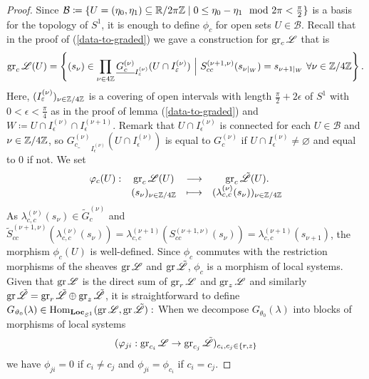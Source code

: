 \begin{proof}
    Since $\mathcal{B}\coloneqq \{U=(\eta_0,\eta_1) \subseteq \mathbb{R}/2\pi\mathbb{Z} \mid 0 \leq \eta_0 - \eta_1 \mod 2\pi < \frac{\pi}{2}\}$ is a basis for the topology of $S^1$,
    it is enough to define $\phi_c$ for open sets $U \in \mathcal{B}$. Recall that in the proof of (\ref{data-to-graded}) we gave a construction for $\operatorname{gr}_c\mathscr{L}$ that is 
    \[
    \operatorname{gr}_c\mathscr{L}(U) = \left\{(s_\nu)\in\prod_{\nu\in \/4\mathbb{Z}} \underline{G_c^{(\nu)}}_{I^{(\nu)}_\varepsilon}(U \cap I^{(\nu)}_\varepsilon) ~\Big\vert ~ S_{cc}^{(\nu+1, \nu)}(s_{\nu\vert_{W}}) = s_{\nu+1\vert_{W}} ~\forall \nu \in \mathbb{Z}/4\mathbb{Z} \right\}.
    \]
    Here, $(I^{(\nu)}_\varepsilon)_{\nu \in \mathbb{Z}/4\mathbb{Z}}$ is a covering of open intervals with length $\frac{\pi}{2}+2\epsilon$ of $S^1$ with $0< \epsilon < \frac{\pi}{4}$ as in the proof of lemma (\ref{data-to-graded}) and $W \coloneqq U \cap I_\epsilon^{(\nu)} \cap I_{\epsilon}^{(\nu+1)}$.
    Remark that $U\cap I^{(\nu)}_\epsilon$ is connected for each $U \in \mathcal{B}$ and $\nu \in \mathbb{Z}/4\mathbb{Z}$, so $\underline{G_c^{(\nu)}}_{I^{(\nu)}_\epsilon}(U \cap I^{(\nu)}_\epsilon)$ is equal to $G_c^{(\nu)}$ if $U \cap I^{(\nu)}_\epsilon \neq \varnothing$ and equal to $0$ if not. We set
    \[
    \begin{matrix}
        \varphi_c(U): &\operatorname{gr}_c\mathscr{L}(U) &\longrightarrow &\operatorname{gr}_c\tilde{\mathscr{L}}(U). \\
        & (s_\nu)_{\nu \in \mathbb{Z}/4\mathbb{Z}} & \longmapsto & (\lambda^{(\nu)}_{c,c}(s_\nu))_{\nu \in \mathbb{Z}/4\mathbb{Z}}
    \end{matrix}
    \]
    As $\lambda_{c,c}^{(\nu)}(s_\nu) \in \tilde{G}_c^{(\nu)}$ and $\tilde{S}_{cc}^{(\nu+1,\nu)}(\lambda_{c,c}^{(\nu)}(s_\nu)) = \lambda_{c,c}^{(\nu+1)}(S^{(\nu+1,\nu)}_{cc}(s_\nu)) = \lambda_{c,c}^{(\nu+1)}(s_{\nu+1})$, the morphism $\phi_c(U)$ is well-defined. Since $\phi_c$ commutes with the restriction morphisms of the sheaves $\operatorname{gr}\mathscr{L}$ and $\operatorname{gr}\tilde{\mathscr{L}}$, $\phi_c$ is a morphism of local systems. Given that $\operatorname{gr}\mathscr{L}$ is the direct sum of $\operatorname{gr}_r\mathscr{L}$ and $\operatorname{gr}_z\mathscr{L}$ and similarly $\operatorname{gr}\tilde{\mathscr{L}} = \operatorname{gr}_r\tilde{\mathscr{L}} \oplus \operatorname{gr}_z\tilde{\mathscr{L}}$, it is straightforward to define $G_{\vartheta_0}(\lambda) \in \operatorname{Hom}_{\mathbf{Loc}_{S^1}}(\operatorname{gr}\mathscr{L},\operatorname{gr}\tilde{\mathscr{L}}):$
    When we decompose $G_{\theta_0}(\lambda)$ into blocks of morphisms of local systems \[(\varphi_{ji}: \operatorname{gr}_{c_i}\mathscr{L} \to \operatorname{gr}_{c_j}\tilde{\mathscr{L}})_{c_i,c_j\in \{r,z\}}\] we have $\phi_{ji} = 0$ if $c_i \neq c_j$ and $\phi_{ji} = \phi_{c_i}$ if $c_i =c_j$.
    

\end{proof}
